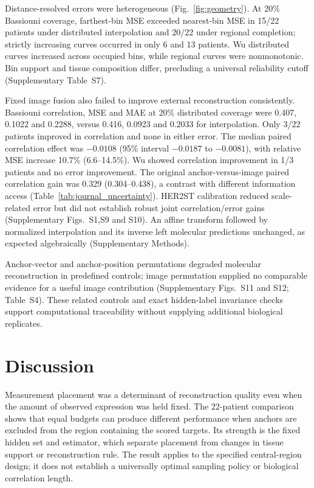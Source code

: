 Distance-resolved errors were heterogeneous (Fig.~\ref{fig:geometry}). At 20\% Bassiouni coverage, farthest-bin MSE exceeded nearest-bin MSE in 15/22 patients under distributed interpolation and 20/22 under regional completion; strictly increasing curves occurred in only 6 and 13 patients. Wu distributed curves increased across occupied bins, while regional curves were nonmonotonic. Bin support and tissue composition differ, precluding a universal reliability cutoff (Supplementary Table~S7).

\FloatBarrier

Fixed image fusion also failed to improve external reconstruction consistently. Bassiouni correlation, MSE and MAE at 20\% distributed coverage were 0.407, 0.1022 and 0.2288, versus 0.416, 0.0923 and 0.2033 for interpolation. Only 3/22 patients improved in correlation and none in either error. The median paired correlation effect was $-0.0108$ (95\% interval $-0.0187$ to $-0.0081$), with relative MSE increase 10.7\% (6.6--14.5\%). Wu showed correlation improvement in 1/3 patients and no error improvement. The original anchor-versus-image paired correlation gain was 0.329 (0.304--0.438), a contrast with different information access (Table~\ref{tab:journal_uncertainty}). HER2ST calibration reduced scale-related error but did not establish robust joint correlation/error gains (Supplementary Figs.~S1,S9 and S10). An affine transform followed by normalized interpolation and its inverse left molecular predictions unchanged, as expected algebraically (Supplementary Methods).


Anchor-vector and anchor-position permutations degraded molecular reconstruction in predefined controls; image permutation supplied no comparable evidence for a useful image contribution (Supplementary Figs.~S11 and S12; Table~S4). These related controls and exact hidden-label invariance checks support computational traceability without supplying additional biological replicates.

\section{Discussion}
Measurement placement was a determinant of reconstruction quality even when the amount of observed expression was held fixed. The 22-patient comparison shows that equal budgets can produce different performance when anchors are excluded from the region containing the scored targets. Its strength is the fixed hidden set and estimator, which separate placement from changes in tissue support or reconstruction rule. The result applies to the specified central-region design; it does not establish a universally optimal sampling policy or biological correlation length.


